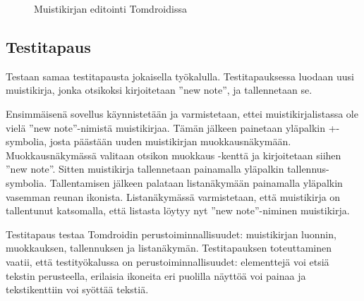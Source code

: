 \begin{figure}[h]
\centering
{}
\caption{Muistikirjan editointi Tomdroidissa} \label{tomdroid_editview}
\end{figure}

\subsection{Testitapaus}
\label{test_case}

Testaan samaa testitapausta jokaisella työkalulla. Testitapauksessa luodaan uusi muistikirja, jonka otsikoksi kirjoitetaan ''new note'', ja tallennetaan se.

Ensimmäisenä sovellus käynnistetään ja varmistetaan, ettei muistikirjalistassa ole vielä ''new note''-nimistä muistikirjaa. Tämän jälkeen painetaan yläpalkin +-symbolia, josta päästään uuden muistikirjan muokkausnäkymään. Muokkausnäkymässä valitaan otsikon muokkaus -kenttä ja kirjoitetaan siihen ''new note''. Sitten muistikirja tallennetaan painamalla yläpalkin tallennus-symbolia. Tallentamisen jälkeen palataan listanäkymään painamalla yläpalkin vasemman reunan ikonista. Listanäkymässä varmistetaan, että muistikirja on tallentunut katsomalla, että listasta löytyy nyt ''new note''-niminen muistikirja.

Testitapaus testaa Tomdroidin perustoiminnallisuudet: muistikirjan luonnin, muokkauksen, tallennuksen ja listanäkymän. Testitapauksen toteuttaminen vaatii, että testityökalussa on perustoiminnallisuudet: elementtejä voi etsiä tekstin perusteella, erilaisia ikoneita eri puolilla näyttöä voi painaa ja tekstikenttiin voi syöttää tekstiä.

